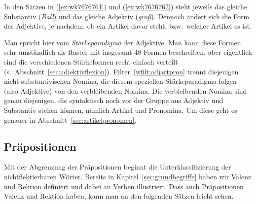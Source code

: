 \label{sec:adjektivewortklassen}

In den Sätzen in (\ref{ex:wk7676761}) und (\ref{ex:wk7676762}) steht jeweils das gleiche Substantiv (\textit{Ball}) und das gleiche Adjektiv (\textit{groß}).
Dennoch ändert sich die Form der Adjektive, je nachdem, ob ein Artikel davor steht, bzw.\ welcher Artikel es ist.

\begin{exe}
  \ex\label{ex:wk7676761}
  \begin{xlist}
  \end{xlist}
  \ex\label{ex:wk7676762}
  \begin{xlist}
  \end{xlist}
\end{exe}

Man spricht hier vom \textit{Stärkeparadigma} der Adjektive.
Man kann diese Formen sehr umständlich als Raster mit insgesamt 48 Formen beschreiben, aber eigentlich sind die verschiedenen Stärkeformen recht einfach verteilt (s.\ Abschnitt~\ref{sec:adjektivflexion}).
Filter~\ref{wfilt:adjartpron} trennt diejenigen nicht-substantivischen Nomina, die diesem speziellen Stärkeparadigma folgen (also Adjektive) von den verbleibenden Nomina.
Die verbleibenden Nomina sind genau diejenigen, die syntaktisch noch vor der Gruppe aus Adjektiv und Substantiv stehen können, nämlich Artikel und Pronomina.
Um diese geht es genauer in Abschnitt~\ref{sec:artikelpronomen}.

\Np


\subsection{Präpositionen}

\label{sec:praepositionenwortklassen}


Mit der Abgrenzung der Präpositionen beginnt die Unterklassifizierung der nichtflektierbaren Wörter. 
Bereits in Kapitel~\ref{sec:grundbegriffe} haben wir Valenz und Rektion definiert und dabei an Verben illustriert.
Dass auch Präpositionen Valenz und Rektion haben, kann man an den folgenden Sätzen leicht sehen.

